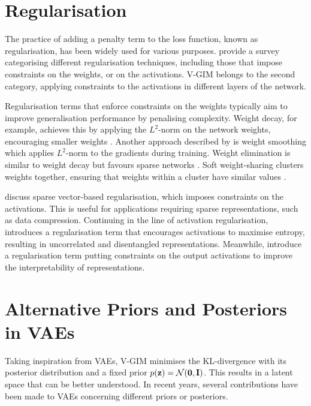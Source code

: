 	
	

\section{Regularisation}
	The practice of adding a penalty term to the loss function, known as regularisation, has been widely used for various purposes. \cite{kukackaRegularizationDeepLearning2017} provide a survey categorising different regularisation techniques, including those that impose constraints on the weights, or on the activations. V-GIM belongs to the second category, applying constraints to the activations in different layers of the network.
	
	Regularisation terms that enforce constraints on the weights typically aim to improve generalisation performance by penalising complexity. Weight decay, for example, achieves this by applying the $L^2$-norm on the network weights, encouraging smaller weights \citep{gneccoWeightdecayTechniqueLearning2009}. Another approach described by \cite{kukackaRegularizationDeepLearning2017} is weight smoothing which applies $L^2$-norm to the gradients during training. Weight elimination is similar to weight decay but favours sparse networks \citep{weigendGeneralizationWeightEliminationApplication1990}. Soft weight-sharing clusters weights together, ensuring that weights within a cluster have similar values \citep{nowlanSimplifyingNeuralNetworks1992}.
	
	\cite{tianComprehensiveSurveyRegularization2022} discuss sparse vector-based regularisation, which imposes constraints on the activations. This is useful for applications requiring sparse representations, such as data compression. Continuing in the line of activation regularisation, \cite{tomczakLearningInformativeFeatures2016} introduces a regularisation term that encourages activations to maximise entropy, resulting in uncorrelated and disentangled representations. Meanwhile, \cite{wuImprovingInterpretabilityRegularization2018} introduce a regularisation term putting constraints on the output activations to improve the interpretability of representations.


\section{Alternative Priors and Posteriors in VAEs} \label{cha:rel_alt_priors}
	Taking inspiration from VAEs, V-GIM minimises the KL-divergence with its posterior distribution and a fixed prior $p(\mathbf{z})=\mathcal{N}(\bm{\mathbf{0}}, \mathbf{I})$. This results in a latent space that can be better understood. In recent years, several contributions have been made to VAEs concerning different priors or posteriors.
	
